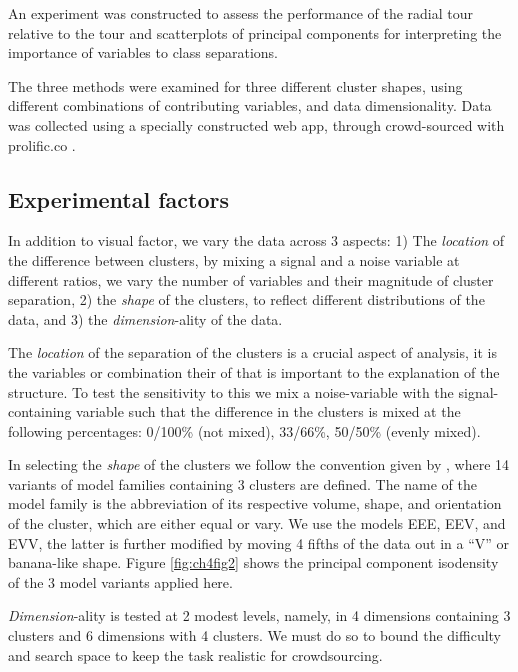 \documentclass{template/monashthesis}
\begin{document}
An experiment was constructed to assess the performance of the radial tour relative to the tour and scatterplots of principal components for interpreting the importance of variables to class separations.

The three methods were examined for three different cluster shapes, using different combinations of contributing variables, and data dimensionality. Data was collected using a specially constructed web app, through crowd-sourced with prolific.co \autocite{palan_prolific_2018}.

\hypertarget{sec:blocks}{%
\subsection{Experimental factors}\label{sec:blocks}}

In addition to visual factor, we vary the data across 3 aspects: 1) The \emph{location} of the difference between clusters, by mixing a signal and a noise variable at different ratios, we vary the number of variables and their magnitude of cluster separation, 2) the \emph{shape} of the clusters, to reflect different distributions of the data, and 3) the \emph{dimension}-ality of the data.

The \emph{location} of the separation of the clusters is a crucial aspect of analysis, it is the variables or combination their of that is important to the explanation of the structure. To test the sensitivity to this we mix a noise-variable with the signal-containing variable such that the difference in the clusters is mixed at the following percentages: 0/100\% (not mixed), 33/66\%, 50/50\% (evenly mixed).

In selecting the \emph{shape} of the clusters we follow the convention given by \textcite{scrucca_mclust_2016}, where 14 variants of model families containing 3 clusters are defined. The name of the model family is the abbreviation of its respective volume, shape, and orientation of the cluster, which are either equal or vary. We use the models EEE, EEV, and EVV, the latter is further modified by moving 4 fifths of the data out in a ``V'' or banana-like shape. Figure \ref{fig:ch4fig2} shows the principal component isodensity of the 3 model variants applied here.

\emph{Dimension}-ality is tested at 2 modest levels, namely, in 4 dimensions containing 3 clusters and 6 dimensions with 4 clusters. We must do so to bound the difficulty and search space to keep the task realistic for crowdsourcing.
\end{document}
